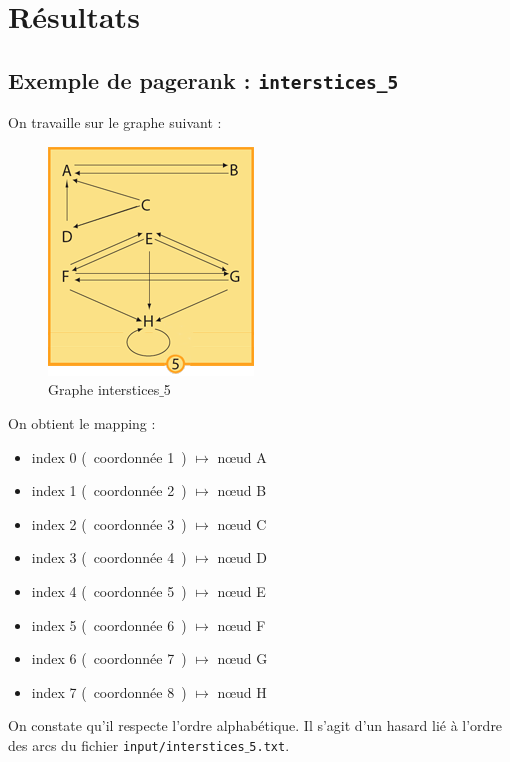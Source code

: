 \documentclass[a4paper,12pt]{article}
\begin{document}
\section{Résultats}

\subsection{Exemple de pagerank : \texttt{interstices\_5}}

On travaille sur le graphe suivant :

\begin{figure}[h] 
  \centering 
  \includegraphics[scale=0.5]{interstices_5_graphe.png}
  \caption{Graphe interstices$\_$5}
\end{figure}

\bigskip

On obtient le mapping : 

\begin{itemize}
  \item index 0 (~coordonnée 1~) $\longmapsto$ n\oe{}ud A
  \item index 1 (~coordonnée 2~) $\longmapsto$ n\oe{}ud B
  \item index 2 (~coordonnée 3~) $\longmapsto$ n\oe{}ud C 
  \item index 3 (~coordonnée 4~) $\longmapsto$ n\oe{}ud D 
  \item index 4 (~coordonnée 5~) $\longmapsto$ n\oe{}ud E 
  \item index 5 (~coordonnée 6~) $\longmapsto$ n\oe{}ud F 
  \item index 6 (~coordonnée 7~) $\longmapsto$ n\oe{}ud G 
  \item index 7 (~coordonnée 8~) $\longmapsto$ n\oe{}ud H 
\end{itemize}
On constate qu'il respecte l'ordre alphabétique. Il s'agit d'un hasard lié à l'ordre des arcs du fichier \texttt{input/interstices$\_$5.txt}.
\end{document}

